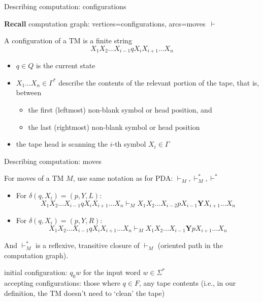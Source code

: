 \documentclass[handout]{beamer}
\begin{document}
\begin{frame}{Describing computation: configurations}

    \textbf{Recall} \alert{computation graph}: vertices=\alert{configurations}, arcs=\alert{moves}~$\vdash$


    A \alert{configuration} of a TM is a finite string 
    $$
    X_1X_2\ldots X_{i-1}qX_iX_{i+1}\ldots X_n
    $$

    \begin{itemize}
        \item $q\in Q$ is the current state
        \item $X_1\ldots X_n\in\Gamma^*$ describe the contents of the relevant portion of the tape, that is, between
        \begin{itemize}
            \item the first (leftmost) non-blank symbol or head position, and
            \item the last (rightmost) non-blank symbol or head position
        \end{itemize} 
        \item the tape head is scanning the $i$-th symbol $X_i\in\Gamma$
    \end{itemize}
    
\end{frame}


\begin{frame}{Describing computation: moves}

    For \alert{moves} of a TM $M$, use same notation as for PDA: $\vdash_M, \vdash_M^*, \vdash^*$
    
    \medskip

    \begin{itemize}
        \item For $\delta(q,X_i)=(p,Y,L)$: 
        $$
        X_1X_2\ldots X_{i-1}qX_iX_{i+1}\ldots X_n \vdash_M X_1X_2\ldots X_{i-2}pX_{i-1}\textbf{Y}X_{i+1}\ldots X_n
        $$
        \item For $\delta(q,X_i)=(p,Y,R)$: 
        $$
        X_1X_2\ldots X_{i-1}qX_iX_{i+1}\ldots X_n \vdash_M X_1X_2\ldots X_{i-1}\textbf{Y}pX_{i+1}\ldots X_n
        $$
    \end{itemize}

    \medskip

    And $\vdash_M^*$ is a reflexive, transitive closure of $\vdash_M$ (oriented \alert{path} in the computation graph).

    \medskip

    \alert{initial configuration:} $q_0w$ for the input word $w\in\Sigma^*$\\
    \alert{accepting configurations:} those where $q\in F$, any tape contents (i.e., in our definition, the TM doesn't need to `clean' the tape)

\end{frame}
\end{document}
